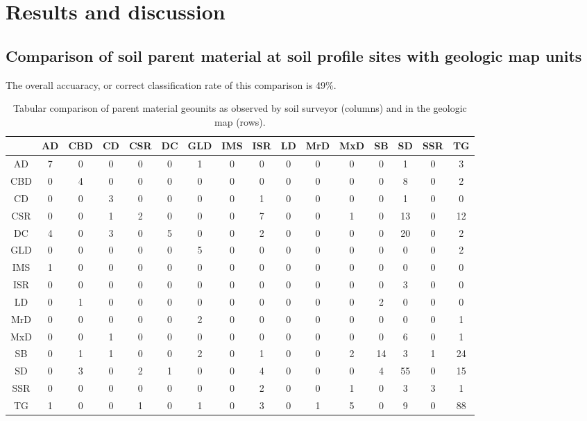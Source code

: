 \documentclass[preprint,12pt,authoryear]{elsarticle}
\begin{document}
\clearpage
\section{Results and discussion}
\subsection{Comparison of soil parent material at soil profile sites with geologic map units}
The overall accuaracy, or correct classification rate of this comparison is 49\%.
\begin{table}[ht]
\centering
\tabcolsep=0.06cm
\begin{tabular}{c|ccccccccccccccc}
 & AD & CBD & CD & CSR & DC & GLD & IMS & ISR & LD & MrD & MxD & SB & SD & SSR & TG \\ 
  \hline
AD &   7 &   0 &   0 &   0 &   0 &   1 &   0 &   0 &   0 &   0 &   0 &   0 &   1 &   0 &   3 \\ 
  CBD &   0 &   4 &   0 &   0 &   0 &   0 &   0 &   0 &   0 &   0 &   0 &   0 &   8 &   0 &   2 \\ 
  CD &   0 &   0 &   3 &   0 &   0 &   0 &   0 &   1 &   0 &   0 &   0 &   0 &   1 &   0 &   0 \\ 
  CSR &   0 &   0 &   1 &   2 &   0 &   0 &   0 &   7 &   0 &   0 &   1 &   0 &  13 &   0 &  12 \\ 
  DC &   4 &   0 &   3 &   0 &   5 &   0 &   0 &   2 &   0 &   0 &   0 &   0 &  20 &   0 &   2 \\ 
  GLD &   0 &   0 &   0 &   0 &   0 &   5 &   0 &   0 &   0 &   0 &   0 &   0 &   0 &   0 &   2 \\ 
  IMS &   1 &   0 &   0 &   0 &   0 &   0 &   0 &   0 &   0 &   0 &   0 &   0 &   0 &   0 &   0 \\ 
  ISR &   0 &   0 &   0 &   0 &   0 &   0 &   0 &   0 &   0 &   0 &   0 &   0 &   3 &   0 &   0 \\ 
  LD &   0 &   1 &   0 &   0 &   0 &   0 &   0 &   0 &   0 &   0 &   0 &   2 &   0 &   0 &   0 \\ 
  MrD &   0 &   0 &   0 &   0 &   0 &   2 &   0 &   0 &   0 &   0 &   0 &   0 &   0 &   0 &   1 \\ 
  MxD &   0 &   0 &   1 &   0 &   0 &   0 &   0 &   0 &   0 &   0 &   0 &   0 &   6 &   0 &   1 \\ 
  SB &   0 &   1 &   1 &   0 &   0 &   2 &   0 &   1 &   0 &   0 &   2 &  14 &   3 &   1 &  24 \\ 
  SD &   0 &   3 &   0 &   2 &   1 &   0 &   0 &   4 &   0 &   0 &   0 &   4 &  55 &   0 &  15 \\ 
  SSR &   0 &   0 &   0 &   0 &   0 &   0 &   0 &   2 &   0 &   0 &   1 &   0 &   3 &   3 &   1 \\ 
  TG &   1 &   0 &   0 &   1 &   0 &   1 &   0 &   3 &   0 &   1 &   5 &   0 &   9 &   0 &  88 \\ 
   \hline
\end{tabular}
\caption{Tabular comparison of parent material geounits as observed by soil surveyor (columns) and in the geologic map (rows).} 
\label{kartiergegenkarte}
\end{table}
\end{document}
